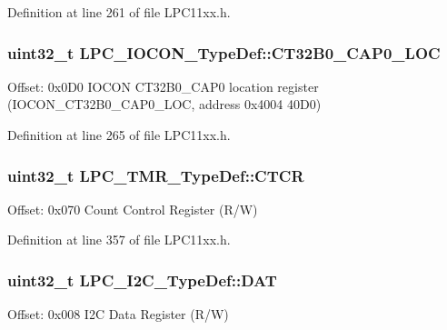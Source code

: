 Definition at line 261 of file L\+P\+C11xx.\+h.

\subsubsection[{\texorpdfstring{C\+T32\+B0\+\_\+\+C\+A\+P0\+\_\+\+L\+OC}{CT32B0_CAP0_LOC}}]{ uint32\+\_\+t L\+P\+C\+\_\+\+I\+O\+C\+O\+N\+\_\+\+Type\+Def\+::\+C\+T32\+B0\+\_\+\+C\+A\+P0\+\_\+\+L\+OC}\hypertarget{group___l_p_c11xx___definitions_gaaeedcd139dfd63880543f3498602fe58}{}\label{group___l_p_c11xx___definitions_gaaeedcd139dfd63880543f3498602fe58}
Offset\+: 0x0\+D0 I\+O\+C\+ON C\+T32\+B0\+\_\+\+C\+A\+P0 location register (I\+O\+C\+O\+N\+\_\+\+C\+T32\+B0\+\_\+\+C\+A\+P0\+\_\+\+L\+OC, address 0x4004 40\+D0) 

Definition at line 265 of file L\+P\+C11xx.\+h.

\subsubsection[{\texorpdfstring{C\+T\+CR}{CTCR}}]{ uint32\+\_\+t L\+P\+C\+\_\+\+T\+M\+R\+\_\+\+Type\+Def\+::\+C\+T\+CR}\hypertarget{group___l_p_c11xx___definitions_ga9f161dc0d6e4dd663a2053058141bc55}{}\label{group___l_p_c11xx___definitions_ga9f161dc0d6e4dd663a2053058141bc55}
Offset\+: 0x070 Count Control Register (R/W) 

Definition at line 357 of file L\+P\+C11xx.\+h.

\subsubsection[{\texorpdfstring{D\+AT}{DAT}}]{ uint32\+\_\+t L\+P\+C\+\_\+\+I2\+C\+\_\+\+Type\+Def\+::\+D\+AT}\hypertarget{group___l_p_c11xx___definitions_gafb767d34e141707ca657ed2df4cbc3f5}{}\label{group___l_p_c11xx___definitions_gafb767d34e141707ca657ed2df4cbc3f5}
Offset\+: 0x008 I2C Data Register (R/W) 


